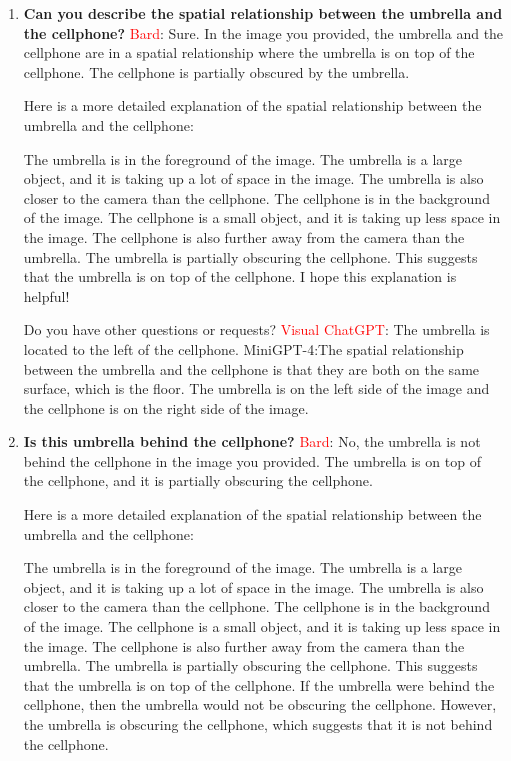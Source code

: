 \begin{enumerate}
    \item \textbf{Can you describe the spatial relationship between the umbrella and the cellphone?}
    \subitem \textcolor{Red}{Bard}: 
    Sure. In the image you provided, the umbrella and the cellphone are in a spatial relationship where the umbrella is on top of the cellphone. The cellphone is partially obscured by the umbrella.
    
    Here is a more detailed explanation of the spatial relationship between the umbrella and the cellphone:
    
    The umbrella is in the foreground of the image. The umbrella is a large object, and it is taking up a lot of space in the image. The umbrella is also closer to the camera than the cellphone.
    The cellphone is in the background of the image. The cellphone is a small object, and it is taking up less space in the image. The cellphone is also further away from the camera than the umbrella.
    The umbrella is partially obscuring the cellphone. This suggests that the umbrella is on top of the cellphone.
    I hope this explanation is helpful!
    
    Do you have other questions or requests?
    \subitem \textcolor{red}{Visual ChatGPT}: The umbrella is located to the left of the cellphone.
    \subitem MiniGPT-4:The spatial relationship between the umbrella and the cellphone is that they are both on the same surface, which is the floor. The umbrella is on the left side of the image and the cellphone is on the right side of the image. 
    \item \textbf{Is this umbrella behind the cellphone?}
    \subitem \textcolor{Red}{Bard}: 
    No, the umbrella is not behind the cellphone in the image you provided. The umbrella is on top of the cellphone, and it is partially obscuring the cellphone.
    
    Here is a more detailed explanation of the spatial relationship between the umbrella and the cellphone:
    
    The umbrella is in the foreground of the image. The umbrella is a large object, and it is taking up a lot of space in the image. The umbrella is also closer to the camera than the cellphone.
    The cellphone is in the background of the image. The cellphone is a small object, and it is taking up less space in the image. The cellphone is also further away from the camera than the umbrella.
    The umbrella is partially obscuring the cellphone. This suggests that the umbrella is on top of the cellphone.
    If the umbrella were behind the cellphone, then the umbrella would not be obscuring the cellphone. However, the umbrella is obscuring the cellphone, which suggests that it is not behind the cellphone.
    

\end{enumerate}
